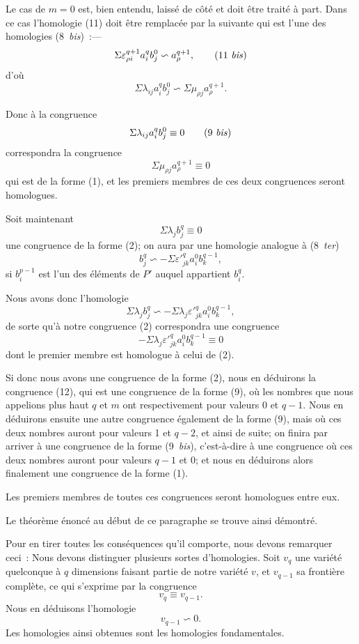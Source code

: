 \documentclass{article}
\begin{document}
Le cas de $m = 0$ est, bien entendu, laissé de côté et doit être traité à part. Dans ce cas l'homologie (11) doit être remplacée par la suivante qui est l'une des homologies (8~\emph{bis})~:---
\[ \Sigma \varepsilon^{q+1}_{\rho i} a^{q}_{i} b^{0}_{j} \backsim a^{q+1}_{\rho}, \tag{11 \textit{bis}} \]
d'où
\[ \Sigma \lambda_{ij} a^{q}_{i} b^{0}_{j} \backsim \Sigma \mu_{\rho j} a^{q+1}_{\rho}. \]

Donc à la congruence
\[ \Sigma \lambda_{ij} a^{q}_{i} b^{0}_{j} \equiv 0 \tag{9 \textit{bis}} \]
correspondra la congruence
\[ \Sigma \mu_{\rho j} a^{q+1}_{\rho} \equiv 0 \]
qui est de la forme (1), et les premiers membres de ces deux congruences seront homologues.

Soit maintenant
\[ \Sigma \lambda_{j} b^{q}_{j} \equiv 0 \tag{2} \]
une congruence de la forme (2); on aura par une homologie analogue à (8~\emph{ter})
\[ b^{q}_{j} \backsim -\Sigma \varepsilon'^{q}_{jk} a^{0}_{i} b^{q-1}_{k}, \]
si $b^{p-1}_{i}$ est l'un des éléments de $P'$ auquel appartient $b^{q}_{i}$.

Nous avons donc l'homologie
\[ \Sigma \lambda_{j} b^{q}_{j} \backsim -\Sigma \lambda_{j} \varepsilon'^{q}_{jk} a^{0}_{i} b^{q-1}_{k}, \]
de sorte qu'à notre congruence (2) correspondra une congruence
\[ -\Sigma \lambda_{j} \varepsilon'^{q}_{jk} a^{0}_{i} b^{q-1}_{k} \equiv 0 \tag{12} \]
dont le premier membre est homologue à celui de (2).

Si donc nous avons une congruence de la forme (2), nous en déduirons la congruence (12), qui est une congruence de la forme (9), où les nombres que nous appelions plus haut $q$ et $m$ ont respectivement pour valeurs 0 et $q-1$. Nous en déduirons ensuite une autre
congruence également de la forme (9), mais où ces deux nombres auront pour valeurs 1 et $q-2$, et ainsi de suite; on finira par arriver à une congruence de la forme (9~\emph{bis}), c'est-à-dire à une congruence où ces deux nombres auront pour valeurs $q-1$ et 0; et nous en déduirons alors finalement une congruence de la forme (1).

Les premiers membres de toutes ces congruences seront homologues entre eux.

Le théorème énoncé au début de ce paragraphe se trouve ainsi démontré.

Pour en tirer toutes les conséquences qu'il comporte, nous devons remarquer ceci~: Nous devons distinguer plusieurs sortes d'homologies. Soit $v_{q}$ une variété quelconque à $q$ dimensions faisant partie de notre variété $v$, et $v_{q-1}$ sa frontière complète, ce qui s'exprime par la congruence
\[ v_{q} \equiv v_{q-1}. \]
Nous en déduisons l'homologie
\[ v_{q-1} \backsim 0. \]
Les homologies ainsi obtenues sont les homologies fondamentales.
\end{document}
